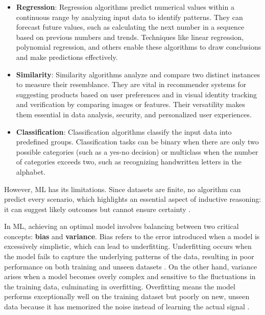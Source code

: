 \begin{itemize}
    \item \textbf{Regression}: 
    Regression algorithms predict numerical values within a continuous range by analyzing input data to identify patterns. They can forecast future values, such as calculating the next number in a sequence based on previous numbers and trends. Techniques like linear regression, polynomial regression, and others enable these algorithms to draw conclusions and make predictions effectively.
    
    \item \textbf{Similarity}: 
    Similarity algorithms analyze and compare two distinct instances to measure their resemblance. They are vital in recommender systems for suggesting products based on user preferences and in visual identity tracking and verification by comparing images or features. Their versatility makes them essential in data analysis, security, and personalized user experiences.
    
    \item \textbf{Classification}: 
    Classification algorithms classify the input data into predefined groups. Classification tasks can be binary when there are only two possible categories (such as a yes-no decision) or multiclass when the number of categories exceeds two, such as recognizing handwritten letters in the alphabet.
\end{itemize}

However, \gls{ML} has its limitations. 
Since datasets are finite, no algorithm can predict every scenario, which highlights an essential aspect of inductive reasoning: it can suggest likely outcomes but cannot ensure certainty \parencite{Mohri2012, Suthaharan2016}. 

In \gls{ML}, achieving an optimal model involves balancing between two critical concepts: \textbf{bias} and \textbf{variance}. 
Bias refers to the error introduced when a model is excessively simplistic, which can lead to underfitting. 
Underfitting occurs when the model fails to capture the underlying patterns of the data, resulting in poor performance on both training and unseen datasets \parencite{ElSahly2023}. 
On the other hand, variance arises when a model becomes overly complex and sensitive to the fluctuations in the training data, culminating in overfitting. 
Overfitting means the model performs exceptionally well on the training dataset but poorly on new, unseen data because it has memorized the noise instead of learning the actual signal \parencite{ElSahly2023}. 

